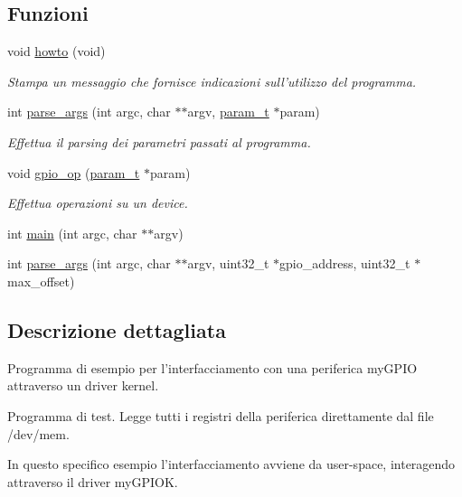 \subsection*{Funzioni}
\begin{DoxyCompactItemize}
\item 
void \hyperlink{group___userspace-program_ga05909651fa170a63e98e3f8e13451b7b}{howto} (void)
\begin{DoxyCompactList}\small\item\em Stampa un messaggio che fornisce indicazioni sull'utilizzo del programma. \end{DoxyCompactList}\item 
int \hyperlink{group___userspace-program_ga65d977fb03a14dedd76e1515d6d24ff4}{parse\+\_\+args} (int argc, char $\ast$$\ast$argv, \hyperlink{structparam__t}{param\+\_\+t} $\ast$param)
\begin{DoxyCompactList}\small\item\em Effettua il parsing dei parametri passati al programma. \end{DoxyCompactList}\item 
void \hyperlink{group___userspace-program_ga63fab82d87963c07f9557a5f5d5d3e86}{gpio\+\_\+op} (\hyperlink{structparam__t}{param\+\_\+t} $\ast$param)
\begin{DoxyCompactList}\small\item\em Effettua operazioni su un device. \end{DoxyCompactList}\item 
int \hyperlink{group___userspace-program_ga3c04138a5bfe5d72780bb7e82a18e627}{main} (int argc, char $\ast$$\ast$argv)
\item 
int \hyperlink{group___userspace-program_ga87c1177178432113628b0885b0cff1b2}{parse\+\_\+args} (int argc, char $\ast$$\ast$argv, uint32\+\_\+t $\ast$gpio\+\_\+address, uint32\+\_\+t $\ast$max\+\_\+offset)
\end{DoxyCompactItemize}


\subsection{Descrizione dettagliata}
Programma di esempio per l'interfacciamento con una periferica my\+G\+P\+I\+O attraverso un driver kernel. 

Programma di test. Legge tutti i registri della periferica direttamente dal file /dev/mem.

In questo specifico esempio l'interfacciamento avviene da user-\/space, interagendo attraverso il driver my\+G\+P\+I\+O\+K. 

